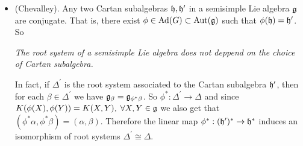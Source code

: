 \begin{itemize}
    \item (Chevalley). Any two Cartan subalgebras $\mathfrak{h},\mathfrak{h}^\prime$ 
    in a semisimple Lie algebra $\mathfrak{g}$ are conjugate. That is, there exist 
    $\phi\in \text{Ad}(G)\subset \text{Aut}(\mathfrak{g})$ such that $\phi(\mathfrak{h})=\mathfrak{h}^\prime$. So 
    \begin{center}
        \textit{The root system of a semisimple Lie algebra does not deppend on the choice of Cartan subalgebra.}
    \end{center}
    In fact, if $\Delta^\prime$ is the root system associated to the Cartan subalgebra $\mathfrak{h}^\prime$, then for each 
    $\beta\in\Delta^\prime$ we have $\mathfrak{g}_\beta=\mathfrak{g}_{\phi^*\beta}$. So $\phi^*:\Delta^\prime\to\Delta$ and since 
    $K(\phi(X),\phi(Y))=K(X,Y),\;\forall X,Y\in\mathfrak{g}$ we also get that $(\phi^*\alpha,\phi^*\beta)=(\alpha,\beta)$. Therefore 
    the linear map $\phi^*:(\mathfrak{h}^\prime)^*\to\mathfrak{h}^*$ induces an isomorphism of root systems $\Delta^\prime\cong\Delta$.


\end{itemize}
